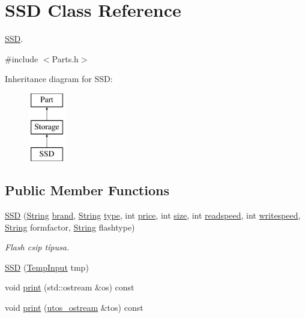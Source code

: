 \hypertarget{class_s_s_d}{}\section{S\+SD Class Reference}
\label{class_s_s_d}


\mbox{\hyperlink{class_s_s_d}{S\+SD}}.  




{\ttfamily \#include $<$Parts.\+h$>$}

Inheritance diagram for S\+SD\+:\begin{figure}[H]
\begin{center}
\leavevmode
\includegraphics[height=3.000000cm]{class_s_s_d}
\end{center}
\end{figure}
\subsection*{Public Member Functions}
\begin{DoxyCompactItemize}
\item 
\mbox{\hyperlink{class_s_s_d_a1e80104276b02f8ca6f016f41a2a5f41}{S\+SD}} (\mbox{\hyperlink{class_string}{String}} \mbox{\hyperlink{class_part_ae06f2fdeb7fbbdb229a7aca151f3e341}{brand}}, \mbox{\hyperlink{class_string}{String}} \mbox{\hyperlink{class_part_a101dbcc5c4b21564df7414c7eb0eae88}{type}}, int \mbox{\hyperlink{class_part_a8e71223aed1da95a974f33d8d6c91bb1}{price}}, int \mbox{\hyperlink{class_storage_abcc80ce58a21fa884035617ee0b6cb67}{size}}, int \mbox{\hyperlink{class_storage_a41073842ff16961dad3903e6dd49bb0c}{readspeed}}, int \mbox{\hyperlink{class_storage_a0198a1483ccf849d48c76da88599ba8b}{writespeed}}, \mbox{\hyperlink{class_string}{String}} formfactor, \mbox{\hyperlink{class_string}{String}} flashtype)
\begin{DoxyCompactList}\small\item\em Flash csip típusa. \end{DoxyCompactList}\item 
\mbox{\hyperlink{class_s_s_d_a39a5322942a5320a9a2be8ac7cb4c596}{S\+SD}} (\mbox{\hyperlink{struct_temp_input}{Temp\+Input}} tmp)
\item 
void \mbox{\hyperlink{class_s_s_d_a3c07aa0fd7bb547cfb4a775513e427a9}{print}} (std\+::ostream \&os) const
\item 
void \mbox{\hyperlink{class_s_s_d_ab07086e302f8be99cfa757583d2017a0}{print}} (\mbox{\hyperlink{structutos__ostream}{utos\+\_\+ostream}} \&tos) const
\end{DoxyCompactItemize}
